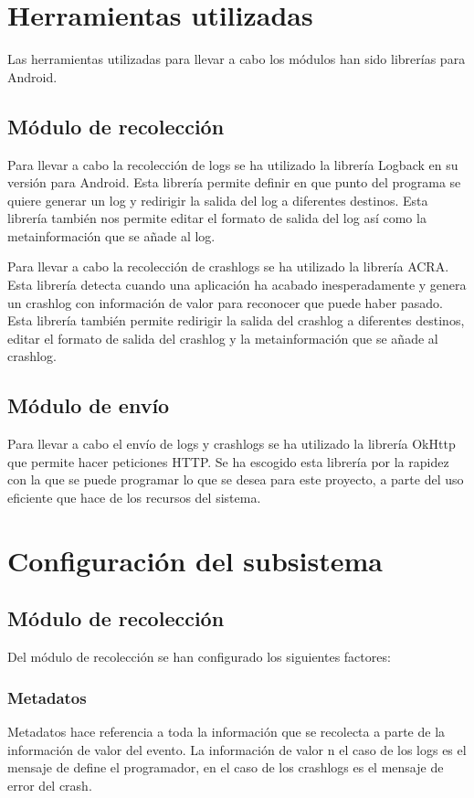 \section{Herramientas utilizadas}

Las herramientas utilizadas para llevar a cabo los módulos han sido librerías para Android.

\subsection{Módulo de recolección}
Para llevar a cabo la recolección de logs se ha utilizado la librería Logback\cite{Tfg:logbackandroid} en su versión para Android. Esta librería permite definir en que punto del programa se quiere generar un log y redirigir la salida del log a diferentes destinos. Esta librería también nos permite editar el formato de salida del log así como la metainformación que se añade al log.

Para llevar a cabo la recolección de crashlogs se ha utilizado la librería ACRA\cite{Tfg:acra}. Esta librería detecta cuando una aplicación ha acabado inesperadamente y genera un crashlog con información de valor para reconocer que puede haber pasado. Esta librería también permite redirigir la salida del crashlog a diferentes destinos, editar el formato de salida del crashlog y la metainformación que se añade al crashlog.

\subsection{Módulo de envío}
Para llevar a cabo el envío de logs y crashlogs se ha utilizado la librería OkHttp\cite{Tfg:okhttp} que permite hacer peticiones HTTP. Se ha escogido esta librería por la rapidez con la que se puede programar lo que se desea para este proyecto, a parte del uso eficiente que hace de los recursos del sistema.

\section{Configuración del subsistema}

\subsection{Módulo de recolección}


Del módulo de recolección se han configurado los siguientes factores:

\subsubsection{Metadatos}
Metadatos hace referencia a toda la información que se recolecta a parte de la información de valor del evento. La información de valor n el caso de los logs es el mensaje de define el programador, en el caso de los crashlogs es el mensaje de error del crash.

